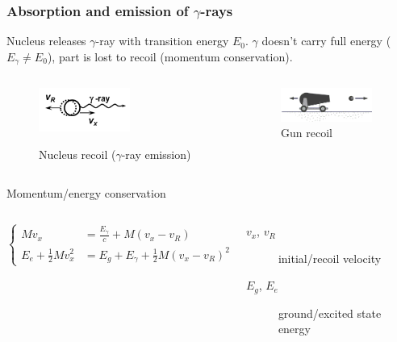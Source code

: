 	\begin{frame}
		\frametitle{Absorption and emission of $\gamma$-rays}
		Nucleus releases $\gamma$-ray with transition energy $E_0$. $\gamma$ doesn't carry full energy ($E_{\gamma} \neq E_0$), part is lost to recoil (momentum conservation).
		\begin{columns}
			\begin{column}{0.53\textwidth}
				\begin{figure}
					\includegraphics[width=3cm]{images/decay.png}
					{\color{black} }
					\caption{Nucleus recoil ($\gamma$-ray emission)}
				\end{figure}
			\end{column}
		
			\begin{column}{0.43\textwidth}
				\begin{figure}
					\includegraphics[width=3cm]{images/recoil-gun.png}
					\caption{Gun recoil}
				\end{figure}
			\end{column}
		\end{columns}
	
		\begin{block}{Momentum/energy conservation}
			\fontsize{9.5pt}{12pt}
			\begin{columns}
				\begin{column}[T]{0.4\linewidth}
					\begin{equation*}
						\begin{cases}
							Mv_x&=\frac{E_{\gamma}}{c} + M(v_x-v_R)\\
							E_e+\frac{1}{2}Mv_x^2&=E_g+E_{\gamma}+\frac{1}{2}M(v_x-v_R)^2
						\end{cases}
					\end{equation*}
				\end{column}
				\begin{column}[T]{0.55\linewidth}
					\begin{description}
						\item [$v_x$, $v_R$] initial/recoil velocity
						\item [$E_g$, $E_e$] ground/excited state energy
					\end{description}
				\end{column}
			\end{columns}
		\end{block}
	\end{frame}
	
